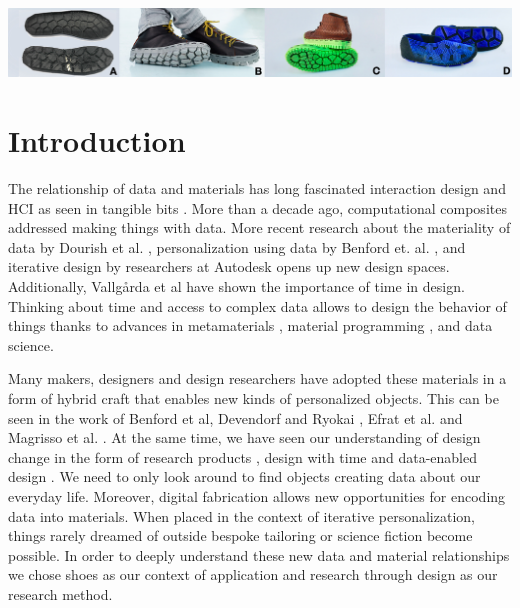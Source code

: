 % 



 
 \begin{teaserfigure}
\includegraphics[width=.99\textwidth]{Header}
\caption{}
\label{fig:header}
\end{teaserfigure}

\section{Introduction}
The relationship of data and materials has long fascinated interaction design and HCI as seen in tangible bits \cite{Ishii1997}. More than a decade ago, computational composites \cite{Vallgarda2007} addressed making things with data. More recent research about the materiality of data by Dourish et al. \cite{Dourish2017} , personalization using data by Benford et. al. \cite{Benford2017}, and iterative design by researchers at Autodesk \cite{Nourbakhsh2016} opens up new design spaces. Additionally, Vallg\aa rda et al \cite{Vallgarda2015} have shown the importance of time in design. Thinking about time and access to complex data allows to design the behavior of things thanks to advances in metamaterials \cite{Ion2018a}, material programming \cite{Vallgarda2016}, and data science. 

Many makers, designers and design researchers have adopted these materials in a form of hybrid craft that enables new kinds of personalized objects. This can be seen in the work of Benford et al, \cite{Benford2018} Devendorf and Ryokai \cite{Devendorf2015}, Efrat et al. \cite{Efrat2016} and Magrisso et al. \cite{Magrisso2018}. At the same time, we have seen our understanding of design change in the form of research products \cite{Odom2016}, design with time \cite{Odom2018} and data-enabled design  \cite{Bogers2016a}. We need to only look around to find objects creating data about our everyday life. Moreover, digital fabrication allows new opportunities for encoding data into materials. When placed in the context of iterative personalization, things rarely dreamed of outside bespoke tailoring or science fiction become possible. In order to deeply understand these new data and material relationships we chose shoes as our context of application and research through design as our research method.

